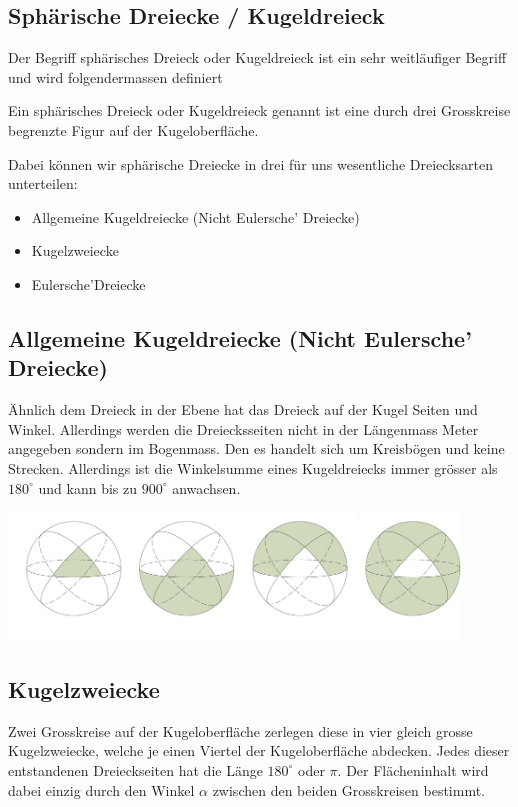\begin{refsection}
\begin{refsection}
\section{Sphärische Dreiecke / Kugeldreieck}
Der Begriff sphärisches Dreieck oder Kugeldreieck ist ein sehr weitläufiger Begriff und wird folgendermassen definiert

\begin{definition}
Ein sphärisches Dreieck oder Kugeldreieck genannt ist eine durch drei Grosskreise begrenzte Figur auf der Kugeloberfläche.
\end{definition} 

Dabei können wir sphärische Dreiecke in drei für uns wesentliche Dreiecksarten unterteilen:

\begin{itemize}
\item Allgemeine Kugeldreiecke (Nicht Eulersche’ Dreiecke)
\item Kugelzweiecke
\item Eulersche’Dreiecke
\end{itemize}


\subsection{Allgemeine Kugeldreiecke (Nicht Eulersche’ Dreiecke)}
Ähnlich dem Dreieck in der Ebene hat das Dreieck auf der Kugel Seiten und Winkel. Allerdings werden die Dreiecksseiten nicht in der Längenmass Meter angegeben sondern im Bogenmass. Den es handelt sich um Kreisbögen und keine Strecken.
Allerdings ist die Winkelsumme eines Kugeldreiecks immer grösser als $180^{\circ}$ und kann bis zu $900^{\circ}$ anwachsen.

\begin{center}
        \includegraphics[width=0.9\textwidth]{kugel/_Dreiecksarten.jpg}
\end{center}


\subsection{Kugelzweiecke} 
Zwei Grosskreise auf der Kugeloberfläche zerlegen diese in vier gleich grosse Kugelzweiecke, welche je einen Viertel der Kugeloberfläche abdecken. 
Jedes dieser entstandenen Dreieckseiten hat die Länge
$180^{\circ}$ oder $\pi$.
Der Flächeninhalt wird dabei einzig durch den Winkel $\alpha$ zwischen den beiden Grosskreisen bestimmt.


\end{refsection}
\end{refsection}
